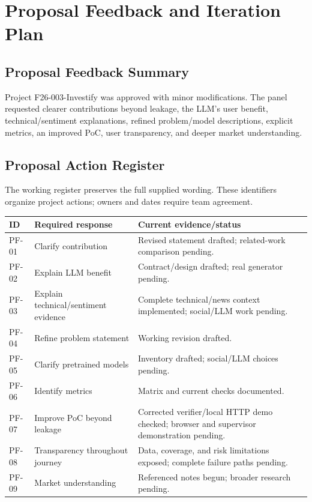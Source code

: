 \chapter{Proposal Feedback and Iteration Plan}
\section{Proposal Feedback Summary}
Project F26-003-Investify was approved with minor modifications. The panel requested clearer contributions beyond leakage, the LLM's user benefit, technical/sentiment explanations, refined problem/model descriptions, explicit metrics, an improved PoC, user transparency, and deeper market understanding.

\section{Proposal Action Register}
The working register preserves the full supplied wording. These identifiers organize project actions; owners and dates require team agreement.
\begin{longtable}{p{}p{}p{}}
\toprule
ID & Required response & Current evidence/status\\
\midrule
PF-01 & Clarify contribution & Revised statement drafted; related-work comparison pending.\\
PF-02 & Explain LLM benefit & Contract/design drafted; real generator pending.\\
PF-03 & Explain technical/sentiment evidence & Complete technical/news context implemented; social/LLM work pending.\\
PF-04 & Refine problem statement & Working revision drafted.\\
PF-05 & Clarify pretrained models & Inventory drafted; social/LLM choices pending.\\
PF-06 & Identify metrics & Matrix and current checks documented.\\
PF-07 & Improve PoC beyond leakage & Corrected verifier/local HTTP demo checked; browser and supervisor demonstration pending.\\
PF-08 & Transparency throughout journey & Data, coverage, and risk limitations exposed; complete failure paths pending.\\
PF-09 & Market understanding & Referenced notes begun; broader research pending.\\
\bottomrule
\end{longtable}

